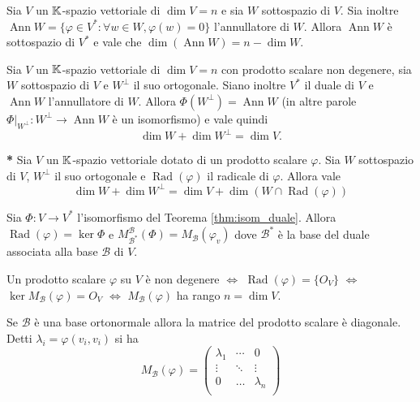 \begin{thm}[annullatore]
	Sia $ V $ un $ \mathbb{K} $-spazio vettoriale di $ \dim{V} = n $ e sia $ W $ sottospazio di $ V $. Sia inoltre $ \operatorname{Ann}{W} = \{\varphi \in V^{*} : \forall w \in W, \varphi(w) = 0\} $ l'annullatore di $ W $. Allora $ \operatorname{Ann}{W} $ è sottospazio di $ V^{*} $ e vale che $ \dim{(\operatorname{Ann}{W})} = n - \dim{W} $. 
\end{thm}

\begin{corollary}
	Sia $ V $ un $ \mathbb{K} $-spazio vettoriale di $ \dim{V} = n $ con prodotto scalare non degenere, sia $ W $ sottospazio di $ V $ e $ W^{\perp} $ il suo ortogonale. Siano inoltre $ V^{*} $ il duale di $ V $ e $ \operatorname{Ann}{W} $ l'annullatore di $ W $. Allora $ \Phi(W^{\perp}) = \operatorname{Ann}{W} $ (in altre parole $ \Phi|_{W^{\perp}} \colon W^{\perp} \to \operatorname{Ann}{W} $ è un isomorfismo) e vale quindi \[\dim{W} + \dim{W^{\perp}} = \dim{V}.\]
\end{corollary}

\begin{thm} \textbf{*}
	Sia $ V $ un $ \mathbb{K} $-spazio vettoriale dotato di un prodotto scalare $ \varphi $. Sia $ W $ sottospazio di $ V $, $ W^{\perp} $ il suo ortogonale e $ \operatorname{Rad}{(\varphi)} $ il radicale di $ \varphi $. Allora vale \[\dim{W} + \dim{W^{\perp}} = \dim{V} + \dim{(W \cap \operatorname{Rad}{(\varphi)})}\]
\end{thm}

\begin{thm}
	Sia $ \Phi \colon V \to V^{*} $ l'isomorfismo del Teorema \ref{thm:isom_duale}. Allora $ \operatorname{Rad}{(\varphi)} = \ker{\Phi} $ e $ M_{\mathscr{B^{*}}}^{\mathscr{B}} (\Phi) = M_{\mathscr{B}}(\varphi_v) $ dove $ \mathscr{B}^{*} $ è la base del duale associata alla base $ \mathscr{B} $ di $ V $. 
\end{thm}

\begin{corollary}
	Un prodotto scalare $ \varphi $ su $ V $ è non degenere $ \iff $ $ \operatorname{Rad}{(\varphi)} = \{O_V\} $ $ \iff $ $ \ker{M_{\mathscr{B}}(\varphi)} = O_V $ $ \iff $ $ M_{\mathscr{B}}(\varphi) $ ha rango $ n = \dim{V} $. 
\end{corollary}

\begin{corollary}
	Se $ \mathscr{B} $ è una base ortonormale allora la matrice del prodotto scalare è diagonale. Detti $ \lambda_i = \varphi(v_i, v_i) $ si ha 
	\[M_{\mathscr{B}}(\varphi) = 
	\begin{pmatrix}
	\lambda_1 & \cdots & 0 \\
	\vdots & \ddots & \vdots \\
	0 & \ldots & \lambda_n \\
	\end{pmatrix}\]
\end{corollary}


